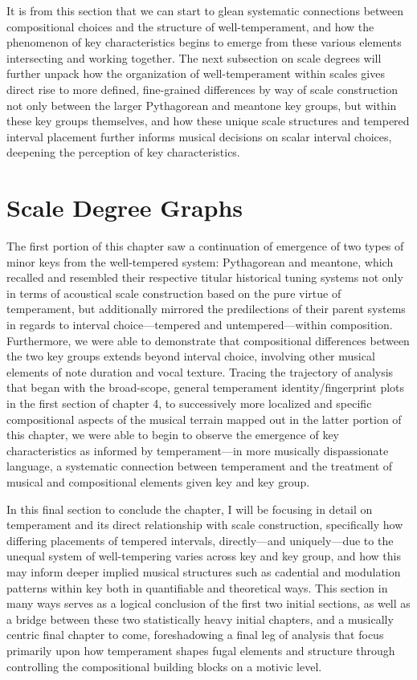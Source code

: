 It is from this section that we can start to glean systematic
connections between compositional choices and the structure of
well-temperament, and how the phenomenon of key characteristics begins
to emerge from these various elements intersecting and working together.
The next subsection on scale degrees will further unpack how the
organization of well-temperament within scales gives direct rise to more
defined, fine-grained differences by way of scale construction not only
between the larger Pythagorean and meantone key groups, but within these
key groups themselves, and how these unique scale structures and
tempered interval placement further informs musical decisions on scalar
interval choices, deepening the perception of key characteristics.

    \section{Scale Degree Graphs}\label{scale-degree-graphs}

The first portion of this chapter saw a continuation of emergence of two
types of minor keys from the well-tempered system: Pythagorean and
meantone, which recalled and resembled their respective titular
historical tuning systems not only in terms of acoustical scale
construction based on the pure virtue of temperament, but additionally
mirrored the predilections of their parent systems in regards to
interval choice---tempered and untempered---within composition.
Furthermore, we were able to demonstrate that compositional differences
between the two key groups extends beyond interval choice, involving
other musical elements of note duration and vocal texture. Tracing the
trajectory of analysis that began with the broad-scope, general
temperament identity/fingerprint plots in the first section of chapter
4, to successively more localized and specific compositional aspects of
the musical terrain mapped out in the latter portion of this chapter, we
were able to begin to observe the emergence of key characteristics as
informed by temperament---in more musically dispassionate language,
a systematic connection between temperament and the treatment of musical
and compositional elements given key and key group.

In this final section to conclude the chapter, I will be focusing in
detail on temperament and its direct relationship with scale
construction, specifically how differing placements of tempered
intervals, directly---and uniquely---due to the unequal system
of well-tempering varies across key and key group, and how this may
inform deeper implied musical structures such as cadential and
modulation patterns within key both in quantifiable and theoretical
ways. This section in many ways serves as a logical conclusion of the
first two initial sections, as well as a bridge between these two
statistically heavy initial chapters, and a musically centric final
chapter to come, foreshadowing a final leg of analysis that focus
primarily upon how temperament shapes fugal elements and structure
through controlling the compositional building blocks on a motivic
level.

